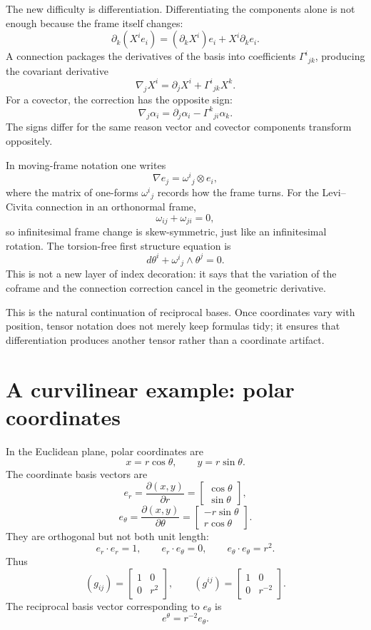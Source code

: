 The new difficulty is differentiation.  Differentiating the components alone is not enough because the frame itself changes:
\[
  \partial_k(X^ie_i)
  =(\partial_kX^i)e_i+X^i\partial_ke_i.
\]
A connection packages the derivatives of the basis into coefficients \(\Gamma^i{}_{jk}\), producing the covariant derivative
\[
  \nabla_jX^i
  =\partial_jX^i+\Gamma^i{}_{jk}X^k.
\]
For a covector, the correction has the opposite sign:
\[
  \nabla_j\alpha_i
  =\partial_j\alpha_i-\Gamma^k{}_{ji}\alpha_k.
\]
The signs differ for the same reason vector and covector components transform oppositely.

In moving-frame notation one writes
\[
  \nabla e_j=\omega^i{}_j\otimes e_i,
\]
where the matrix of one-forms \(\omega^i{}_j\) records how the frame turns.  For the Levi--Civita connection in an orthonormal frame,
\[
  \omega_{ij}+\omega_{ji}=0,
\]
so infinitesimal frame change is skew-symmetric, just like an infinitesimal rotation.  The torsion-free first structure equation is
\[
  d\theta^i+\omega^i{}_j\wedge\theta^j=0.
\]
This is not a new layer of index decoration: it says that the variation of the coframe and the connection correction cancel in the geometric derivative.

This is the natural continuation of reciprocal bases.  Once coordinates vary with position, tensor notation does not merely keep formulas tidy; it ensures that differentiation produces another tensor rather than a coordinate artifact.

\section{A curvilinear example: polar coordinates}

In the Euclidean plane, polar coordinates are
\[
  x=r\cos\theta,
  \qquad
  y=r\sin\theta.
\]
The coordinate basis vectors are
\[
  e_r=\frac{\partial(x,y)}{\partial r}
  =
  \begin{bmatrix}
    \cos\theta\\
    \sin\theta
  \end{bmatrix},
\]
\[
  e_\theta=\frac{\partial(x,y)}{\partial\theta}
  =
  \begin{bmatrix}
    -r\sin\theta\\
    r\cos\theta
  \end{bmatrix}.
\]
They are orthogonal but not both unit length:
\[
  e_r\cdot e_r=1,
  \qquad
  e_r\cdot e_\theta=0,
  \qquad
  e_\theta\cdot e_\theta=r^2.
\]
Thus
\[
  (g_{ij})=
  \begin{bmatrix}
    1&0\\
    0&r^2
  \end{bmatrix},
  \qquad
  (g^{ij})=
  \begin{bmatrix}
    1&0\\
    0&r^{-2}
  \end{bmatrix}.
\]
The reciprocal basis vector corresponding to \(e_\theta\) is
\[
  e^\theta=r^{-2}e_\theta.
\]

